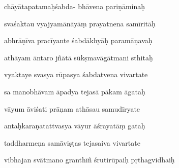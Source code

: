 \documentclass[article,12pt,a4paper]{memoir}%
\newcounter{parCount}
\begin{document}
	  
	  \pstart \leavevmode%
	chāyātapatamaḥśabda- bhāvena pariṇāminaḥ 
	{}
	\pend%
      

	  
	  \pstart {} svaśaktau vyajyamānāyāṃ prayatnena samīritāḥ 
	{}
	\pend%
      

	  
	  \pstart \leavevmode%
	abhrāṇīva pracīyante śabdākhyāḥ paramāṇavaḥ 
	{}
	\pend%
      

	  
	  \pstart {} athāyam āntaro jñātā sūkṣmavāgātmani sthitaḥ 
	{}
	\pend%
      

	  
	  \pstart \leavevmode%
	vyaktaye svasya rūpasya śabdatvena vivartate 
	{}
	\pend%
      

	  
	  \pstart {} sa manobhāvam āpadya tejasā pākam āgataḥ 
	{}
	\pend%
      

	  
	  \pstart \leavevmode%
	vāyum āviśati prāṇam athāsau samudīryate 
	{}
	\pend%
      

	  
	  \pstart {} antaḥkaraṇatattvasya vāyur āśrayatāṃ gataḥ 
	{}
	\pend%
      

	  
	  \pstart \leavevmode%
	taddharmeṇa samāviṣṭas tejasaiva vivartate 
	{}
	\pend%
      

	  
	  \pstart {} vibhajan svātmano granthīñ śrutirūpaiḥ pṛthagvidhaiḥ 
	{}
	\pend%
      
\end{document}
